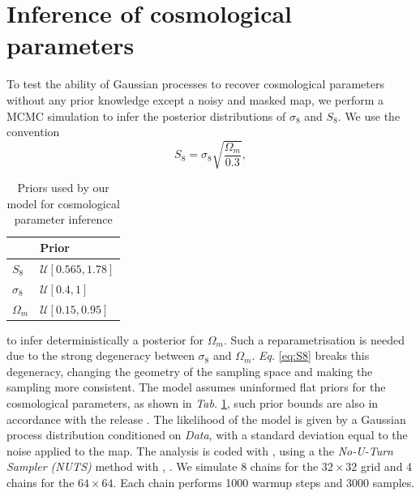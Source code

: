 \section{Inference of cosmological parameters}
\label{sec:inference of cosmological parameters}
To test the ability of Gaussian processes to recover cosmological parameters without any prior knowledge except a noisy and masked map, we perform a MCMC simulation to infer the posterior distributions of $\sigma_8$ and $S_8$. We use the convention 
\begin{equation}
    S_8 = \sigma_8 \sqrt{\frac{\Omega_m}{0.3}},
    \label{eq:S8}
\end{equation}
\begin{table}
\centering
\caption{Priors used by our  model for cosmological parameter inference}\label{tab:priors}
\begin{tabular}{ll}
    \toprule
     & Prior \\
    \midrule
    $S_8$ & $\mathcal{U}[0.565,1.78]$ \\
    $\sigma_8$ & $\mathcal{U}[0.4,1]$ \\
    $\Omega_m$ & $\mathcal{U}[0.15,0.95]$ \\
    \bottomrule
\end{tabular}
\end{table} 
to infer deterministically a posterior for $\Omega_m$. Such a reparametrisation is needed due to the strong degeneracy between $\sigma_8$ and $\Omega_m$. \textit{Eq. }\eqref{eq:S8} breaks this degeneracy, changing the geometry of the sampling space and making the sampling more consistent. The model assumes uninformed flat priors for the cosmological parameters, as shown in \textit{Tab. }\ref{tab:priors}, such prior bounds are also in accordance with the  release \cite{jaxcosmo}. The likelihood of the model is given by a Gaussian process distribution conditioned on \textit{Data}, with a standard deviation equal to the noise applied to the map. The analysis is coded with  \cite{numpyro} \cite{numpyro2}, using a the \textit{No-U-Turn Sampler (NUTS)} method with , . We simulate 8 chains for the $32\times32$ grid and 4 chains for the $64\times64$. Each chain performs 1000 warmup steps and 3000 samples. 


